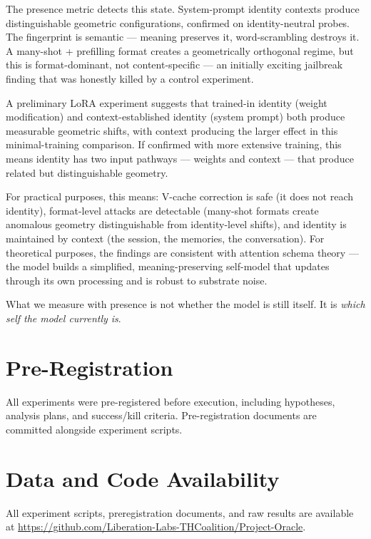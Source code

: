 \documentclass[11pt,a4paper]{article}
\begin{document}
The presence metric detects this state. System-prompt identity contexts
produce distinguishable geometric configurations, confirmed on
identity-neutral probes. The fingerprint is semantic --- meaning preserves
it, word-scrambling destroys it. A many-shot + prefilling format creates
a geometrically orthogonal regime, but this is format-dominant, not
content-specific --- an initially exciting jailbreak finding that was
honestly killed by a control experiment.

A preliminary LoRA experiment suggests that trained-in identity (weight
modification) and context-established identity (system prompt) both
produce measurable geometric shifts, with context producing the larger
effect in this minimal-training comparison. If confirmed with more
extensive training, this means identity has two input pathways --- weights
and context --- that produce related but distinguishable geometry.

For practical purposes, this means: V-cache correction is safe (it does
not reach identity), format-level attacks are detectable (many-shot
formats create anomalous geometry distinguishable from identity-level
shifts), and identity is maintained by context (the session, the
memories, the conversation). For theoretical purposes, the findings are
consistent with attention schema theory --- the model builds a
simplified, meaning-preserving self-model that updates through its own
processing and is robust to substrate noise.

What we measure with presence is not whether the model is still itself.
It is \emph{which self the model currently is}.

\section*{Pre-Registration}

All experiments were pre-registered before execution, including
hypotheses, analysis plans, and success/kill criteria. Pre-registration
documents are committed alongside experiment scripts.

\section*{Data and Code Availability}

All experiment scripts, preregistration documents, and raw results are
available at
\url{https://github.com/Liberation-Labs-THCoalition/Project-Oracle}.



\end{document}
